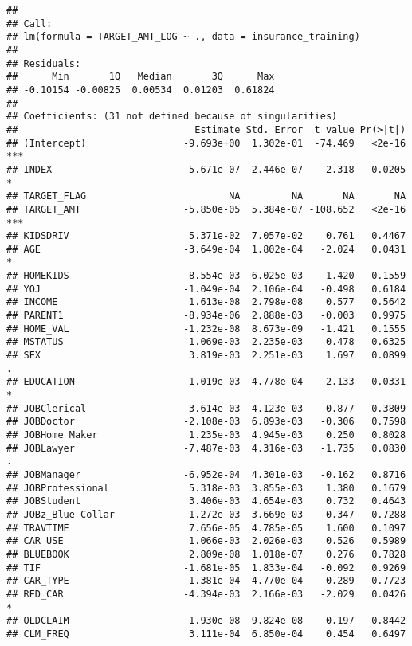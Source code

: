 \documentclass[
]{article}
\begin{document}
\begin{verbatim}
## 
## Call:
## lm(formula = TARGET_AMT_LOG ~ ., data = insurance_training)
## 
## Residuals:
##      Min       1Q   Median       3Q      Max 
## -0.10154 -0.00825  0.00534  0.01203  0.61824 
## 
## Coefficients: (31 not defined because of singularities)
##                               Estimate Std. Error  t value Pr(>|t|)    
## (Intercept)                 -9.693e+00  1.302e-01  -74.469   <2e-16 ***
## INDEX                        5.671e-07  2.446e-07    2.318   0.0205 *  
## TARGET_FLAG                         NA         NA       NA       NA    
## TARGET_AMT                  -5.850e-05  5.384e-07 -108.652   <2e-16 ***
## KIDSDRIV                     5.371e-02  7.057e-02    0.761   0.4467    
## AGE                         -3.649e-04  1.802e-04   -2.024   0.0431 *  
## HOMEKIDS                     8.554e-03  6.025e-03    1.420   0.1559    
## YOJ                         -1.049e-04  2.106e-04   -0.498   0.6184    
## INCOME                       1.613e-08  2.798e-08    0.577   0.5642    
## PARENT1                     -8.934e-06  2.888e-03   -0.003   0.9975    
## HOME_VAL                    -1.232e-08  8.673e-09   -1.421   0.1555    
## MSTATUS                      1.069e-03  2.235e-03    0.478   0.6325    
## SEX                          3.819e-03  2.251e-03    1.697   0.0899 .  
## EDUCATION                    1.019e-03  4.778e-04    2.133   0.0331 *  
## JOBClerical                  3.614e-03  4.123e-03    0.877   0.3809    
## JOBDoctor                   -2.108e-03  6.893e-03   -0.306   0.7598    
## JOBHome Maker                1.235e-03  4.945e-03    0.250   0.8028    
## JOBLawyer                   -7.487e-03  4.316e-03   -1.735   0.0830 .  
## JOBManager                  -6.952e-04  4.301e-03   -0.162   0.8716    
## JOBProfessional              5.318e-03  3.855e-03    1.380   0.1679    
## JOBStudent                   3.406e-03  4.654e-03    0.732   0.4643    
## JOBz_Blue Collar             1.272e-03  3.669e-03    0.347   0.7288    
## TRAVTIME                     7.656e-05  4.785e-05    1.600   0.1097    
## CAR_USE                      1.066e-03  2.026e-03    0.526   0.5989    
## BLUEBOOK                     2.809e-08  1.018e-07    0.276   0.7828    
## TIF                         -1.681e-05  1.833e-04   -0.092   0.9269    
## CAR_TYPE                     1.381e-04  4.770e-04    0.289   0.7723    
## RED_CAR                     -4.394e-03  2.166e-03   -2.029   0.0426 *  
## OLDCLAIM                    -1.930e-08  9.824e-08   -0.197   0.8442    
## CLM_FREQ                     3.111e-04  6.850e-04    0.454   0.6497    

\end{verbatim}
\end{document}
